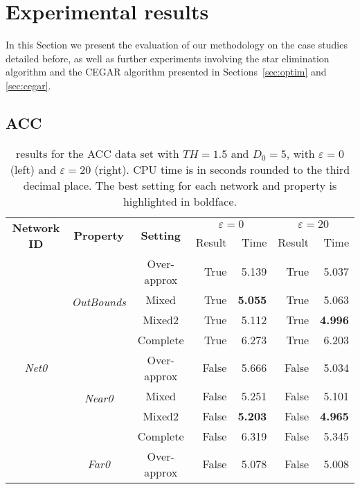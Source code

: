\section{Experimental results}
\label{sec:nn-exp_results}

In this Section we present the evaluation of our methodology on the case studies
detailed before, as well as further experiments involving the star elimination
algorithm and the CEGAR algorithm presented in Sections~\ref{sec:optim} and
\ref{sec:cegar}.

\subsection{ACC}

\begin{table}[t!]
	\caption{\label{tab:acc_results} \nevertwo{} results for the ACC data set with
		$TH=1.5$ and $D_0=5$, with $\varepsilon = 0$ (left) and $\varepsilon = 20$
		(right). CPU time is in seconds rounded to the third decimal
		place. The best setting for each network and property is highlighted in 
		boldface.}
	\setlength{\tabcolsep}{9pt}
	\renewcommand{\arraystretch}{0.8}
	\centering
	\begin{tabular}{c c c rr rr}
		\toprule
		\multirow{2}{*}{\textbf{Network ID}} & \multirow{2}{*}{\textbf{Property}} & 
		\multirow{2}{*}{\textbf{Setting}} & \multicolumn{2}{c}{$\varepsilon = 0$} &
		\multicolumn{2}{c}{$\varepsilon = 20$} \\
		\cmidrule{4-7}
		 & & & Result & Time & Result & Time \\
		\midrule
		\multirow{12}{*}{\textit{Net0}} & \multirow{4}{*}{\textit{OutBounds}} 
		   & Over-approx & True & 5.139 & True & 5.037 \\
		 & & Mixed & True & \textbf{5.055} & True & 5.063 \\
		 & & Mixed2 & True & 5.112 & True & \textbf{4.996} \\
		 & & Complete & True & 6.273 & True & 6.203 \\
		 \cmidrule{2-7}
		 & \multirow{4}{*}{\textit{Near0}} 
		   & Over-approx & False & 5.666 & False & 5.034 \\
		 & & Mixed & False & 5.251 & False & 5.101 \\
		 & & Mixed2 & False & \textbf{5.203} & False & \textbf{4.965} \\
		 & & Complete & False & 6.319 & False & 5.345 \\
		 \cmidrule{2-7}
		 & \multirow{4}{*}{\textit{Far0}}
		   & Over-approx & False & 5.078 & False & 5.008 \\

\end{tabular}
\end{table}
